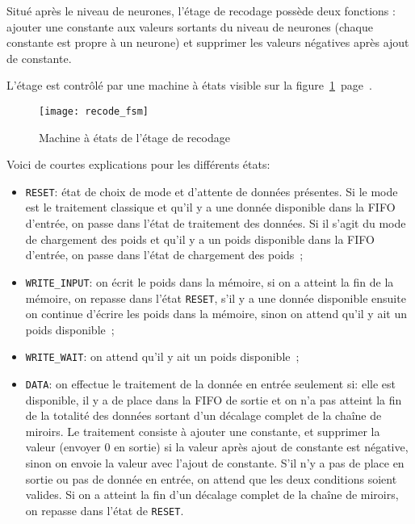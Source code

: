 Situé après le niveau de neurones, l'étage de recodage possède deux fonctions :
ajouter une constante aux valeurs sortants du niveau de neurones (chaque
constante est propre à un neurone) et
supprimer les valeurs négatives après ajout de constante.

L'étage est contrôlé par une machine à états visible sur la
figure~\ref{fig:recode_fsm}~page~\pageref{fig:recode_fsm}.

\begin{figure}[h!]
	\texttt{[image: recode\_fsm]}
	\caption{Machine à états de l'étage de recodage}
	\label{fig:recode_fsm}
\end{figure}

Voici de courtes explications pour les différents états:
\begin{itemize}
	\item \verb+RESET+: état de choix de mode et d'attente de données présentes.
		Si le mode est le traitement classique et qu'il y a une donnée
		disponible dans la FIFO d'entrée, on passe dans l'état de traitement
		des données. Si il s'agit du mode de chargement des poids
		et qu'il y a un poids disponible dans la FIFO d'entrée, on passe dans l'état
		de chargement des poids~;
	\item \verb+WRITE_INPUT+: on écrit le poids dans la mémoire,
		si on a atteint la fin de la mémoire, on repasse dans l'état \verb+RESET+,
		s'il y a une donnée
		disponible ensuite on continue d'écrire les poids dans la mémoire,
		sinon on attend qu'il y ait un poids disponible~;
	\item \verb+WRITE_WAIT+: on attend qu'il y ait un poids disponible~;
	\item \verb+DATA+: on effectue le traitement de la donnée en entrée seulement si:
		elle est disponible, il y a de place dans la FIFO de sortie et on n'a pas atteint
		la fin de la totalité des données sortant d'un décalage complet de la chaîne
		de miroirs. Le traitement consiste à ajouter une constante, et supprimer la valeur
		(envoyer 0 en sortie) si la valeur après ajout de constante est négative, sinon on
		envoie la valeur avec l'ajout de constante.
		S'il n'y a pas de place en sortie ou pas de donnée en entrée, on attend que les deux conditions
		soient valides.
		Si on a atteint la fin d'un décalage complet de la chaîne de miroirs, on repasse dans
		l'état de \verb+RESET+.
\end{itemize}

